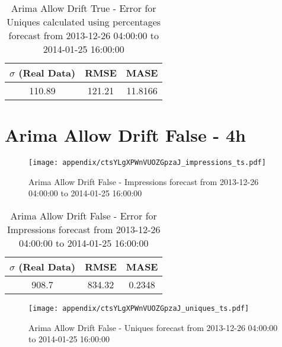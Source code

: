 \begin{table}[H]
\centering
\footnotesize
\begin{tabular}{ccc}
$\sigma$ (Real Data) & RMSE & MASE   \\ \hline
110.89 & 121.21 & 11.8166 \\
\end{tabular}

\vspace{0.5cm}

\caption{
Arima Allow Drift True - Error for Uniques calculated using percentages forecast from 2013-12-26 04:00:00 to 2014-01-25 16:00:00}
\end{table}

\section{Arima Allow Drift False - 4h}
\begin{figure}[H] \begin{center} \leavevmode
\texttt{[image: appendix/ctsYLgXPWnVUOZGpzaJ\_impressions\_ts.pdf]} \caption{
Arima Allow Drift False - Impressions forecast from 2013-12-26 04:00:00 to 2014-01-25 16:00:00} \label{fig:appendix/ctsYLgXPWnVUOZGpzaJ_impressions_ts.pdf} \end{center}
\end{figure}

\begin{table}[H]
\centering
\footnotesize
\begin{tabular}{ccc}
$\sigma$ (Real Data) & RMSE & MASE   \\ \hline
908.7 & 834.32 & 0.2348 \\
\end{tabular}

\vspace{0.5cm}

\caption{
Arima Allow Drift False - Error for Impressions forecast from 2013-12-26 04:00:00 to 2014-01-25 16:00:00}
\end{table}

\begin{figure}[H] \begin{center} \leavevmode
\texttt{[image: appendix/ctsYLgXPWnVUOZGpzaJ\_uniques\_ts.pdf]} \caption{
Arima Allow Drift False - Uniques forecast from 2013-12-26 04:00:00 to 2014-01-25 16:00:00} \label{fig:appendix/ctsYLgXPWnVUOZGpzaJ_uniques_ts.pdf} \end{center}
\end{figure}

